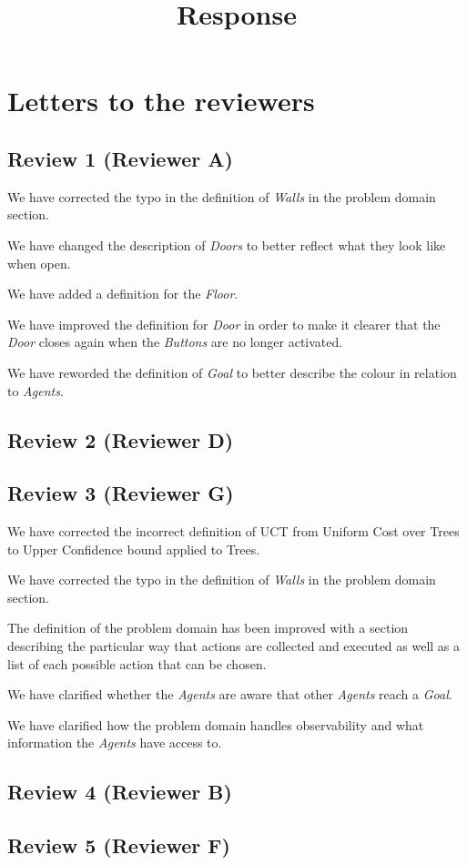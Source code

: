 \documentclass{article}
\title{Response}
\begin{document}
\maketitle
\section{Letters to the reviewers}
\subsection{Review 1 (Reviewer A)}
We have corrected the typo in the definition of \emph{Walls} in the problem domain section.

We have changed the description of \emph{Doors} to better reflect what they look like when open.

We have added a definition for the \emph{Floor}.

We have improved the definition for \emph{Door} in order to make it clearer that the \emph{Door} closes again when the \emph{Buttons} are no longer activated.

We have reworded the definition of \emph{Goal} to better describe the colour in relation to \emph{Agents}.
\subsection{Review 2 (Reviewer D)}
\subsection{Review 3 (Reviewer G)}
We have corrected the incorrect definition of UCT from Uniform Cost over Trees to Upper Confidence bound applied to Trees.

We have corrected the typo in the definition of \emph{Walls} in the problem domain section.

The definition of the problem domain has been improved with a section describing the particular way that actions are collected and executed as well as a list of each possible action that can be chosen.

We have clarified whether the \emph{Agents} are aware that other \emph{Agents} reach a \emph{Goal}.

We have clarified how the problem domain handles observability and what information the \emph{Agents} have access to.
\subsection{Review 4 (Reviewer B)}
\subsection{Review 5 (Reviewer F)}
\end{document}
